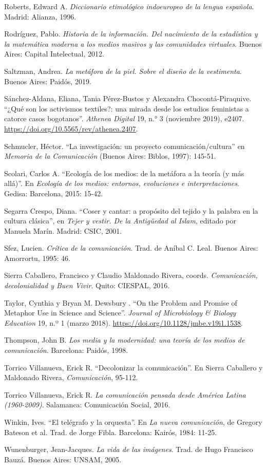 \documentclass{tufte-handout}
\begin{document}
\begin{hangparas}{.25in}{1}
Roberts, Edward A. \emph{Diccionario etimológico indoeuropeo de la
lengua española}. Madrid: Alianza, 1996.

Rodríguez, Pablo. \emph{Historia de la información. Del nacimiento de la
estadística y la matemática moderna a los medios masivos y las
comunidades virtuales}. Buenos Aires: Capital Intelectual, 2012.

Saltzman, Andrea. \emph{La metáfora de la piel. Sobre el diseño de la
vestimenta}. Buenos Aires: Paidós, 2019.

Sánchez-Aldana, Eliana, Tania Pérez-Bustos y Alexandra
Chocontá-Piraquive. ``¿Qué son los activismos textiles?: una mirada
desde los estudios feministas a catorce casos bogotanos''. \emph{Athenea
Digital} 19, n.° 3 (noviembre 2019), e2407.
\url{https://doi.org/10.5565/rev/athenea.2407}.

Schmucler, Héctor. ``La investigación: un proyecto
comunicación/cultura'' en \emph{Memoria de la Comunicación} (Buenos
Aires: Biblos, 1997): 145-51.

Scolari, Carlos A. ``Ecología de los medios: de la metáfora a la teoría
(y más allá)''. En \emph{Ecología de los medios: entornos, evoluciones e
interpretaciones}. Gedisa: Barcelona, 2015: 15-42.

Segarra Crespo, Diana. ``Coser y cantar: a propósito del tejido y la
palabra en la cultura clásica'', en \emph{Tejer y vestir. De la
Antigüedad al Islam}, editado por Manuela Marín. Madrid: CSIC, 2001.

Sfez, Lucien. \emph{Crítica de la comunicación}. Trad. de Aníbal C.
Leal. Buenos Aires: Amorrortu, 1995: 46.

Sierra Caballero, Francisco y Claudio Maldonado Rivera, coords.
\emph{Comunicación, decolonialidad y Buen Vivir}. Quito: CIESPAL, 2016.

Taylor, Cynthia y Bryan M. Dewsbury . ``On the Problem and Promise of
Metaphor Use in Science and Science''. \emph{Journal of Microbiology \&
Biology Education} 19, n.º 1 (marzo 2018).
\url{https://doi.org/10.1128/jmbe.v19i1.1538}.

Thompson, John B. \emph{Los media y la modernidad: una teoría de los
medios de comunicación}. Barcelona: Paidós, 1998.

Torrico Villanueva, Erick R. ``Decolonizar la comunicación''. En Sierra
Caballero y Maldonado Rivera, \emph{Comunicación}, 95-112.

Torrico Villanueva, Erick R. \emph{La comunicación pensada desde América
Latina (1960-2009)}. Salamanca: Comunicación Social, 2016.

Winkin, Ives. ``El telégrafo y la orquesta''. En \emph{La nueva
comunicación}, de Gregory Bateson et al. Trad. de Jorge Fibla.
Barcelona: Kairós, 1984: 11-25.

Wunenburger, Jean-Jacques. \emph{La vida de las imágenes}. Trad. de Hugo
Francisco Bauzá. Buenos Aires: UNSAM, 2005.



\end{hangparas}
\end{document}

